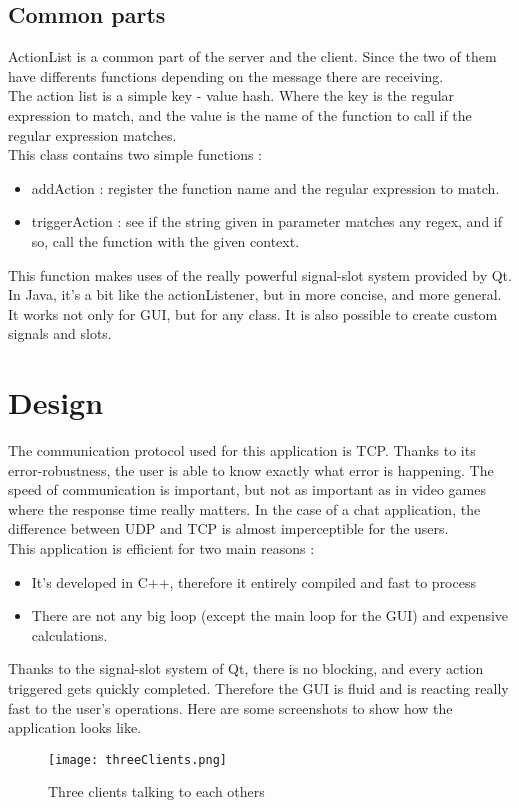 \documentclass[12pt]{report}
\begin{document}
\section{Common parts}
ActionList is a common part of the server and the client. Since the two of them have differents functions depending on the message there are receiving.\\
The action list is a simple key - value hash. Where the key is the regular expression to match, and the value is the name of the function to call if the regular expression matches.\\
This class contains two simple functions :
\begin{itemize}
	\item addAction : register the function name and the regular expression to match.
	\item triggerAction : see if the string given in parameter matches any regex, and if so, call the function with the given context.
\end{itemize}
This function makes uses of the really powerful signal-slot system provided by Qt. In Java, it's a bit like the actionListener, but in more concise, and more general. It works not only for GUI, but for any class. It is also possible to create custom signals and slots.

\chapter{Design}
The communication protocol used for this application is TCP. Thanks to its error-robustness, the user is able to know exactly what error is happening. The speed of communication is important, but not as important as in video games where the response time really matters. In the case of a chat application, the difference between UDP and TCP is almost imperceptible for the users.\\
This application is efficient for two main reasons :
\begin{itemize}
	\item It's developed in C++, therefore it entirely compiled and fast to process
	\item There are not any big loop (except the main loop for the GUI) and expensive calculations.
\end{itemize}
Thanks to the signal-slot system of Qt, there is no blocking, and every action triggered gets quickly completed. Therefore the GUI is fluid and is reacting really fast to the user's operations. Here are some screenshots to show how the application looks like.
\begin{figure}[H]
	\centering
	\texttt{[image: threeClients.png]}
	\caption{Three clients talking to each others}
\end{figure}
\end{document}
